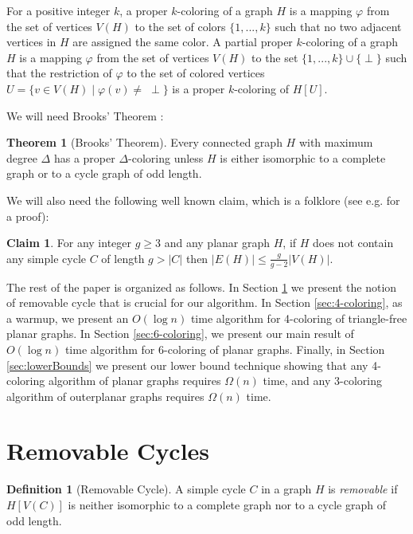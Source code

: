 \documentclass{article}
\theoremstyle{definition}
\newtheorem{theorem}{Theorem}[section]
\newtheorem{definition}{Definition}[section]
\newtheorem{claim}{Claim}[section]
\begin{document}
For a positive integer $k$, a proper $k$-coloring of a graph $H$ is a mapping $\varphi$ from the set of vertices $V(H)$ to the set of colors $\{1, ..., k\}$ such that no two adjacent vertices in $H$ are assigned the same color. A partial proper $k$-coloring of a graph $H$ is a mapping $\varphi$ from the set of vertices $V(H)$ to the set $\{1, ..., k\} \cup \{\perp\}$ such that the restriction of $\varphi$ to the set of colored vertices $U = \{v \in V(H) \mid \varphi(v) \ne \; \perp\}$ is a proper $k$-coloring of $H[U]$.

\medskip

We will need Brooks' Theorem \cite{Brooks41}:

\begin{theorem}[Brooks' Theorem] Every connected graph $H$ with maximum degree $\Delta$ has a proper $\Delta$-coloring unless $H$ is either isomorphic to a complete graph or to a cycle graph of odd length.\end{theorem}

We will also need the following well known claim, which is a folklore (see e.g. \cite{BarenboimElkinBook13} for a proof):
\begin{claim} For any integer $g \ge 3$ and any planar graph $H$, if $H$ does not contain any simple cycle $C$ of length $g > |C|$ then $|E(H)| \le \frac{g}{g-2}|V(H)|$.\label{claim:numberOfEdges}
\end{claim}

The rest of the paper is organized as follows.
In Section \ref{sec:removable} we present the notion of removable cycle that is crucial for our algorithm.
In Section \ref{sec:4-coloring}, as a warmup, we  present an $O(\log{n})$ time algorithm for 4-coloring  of triangle-free planar graphs.
In Section \ref{sec:6-coloring}, we present our main result of $O(\log{n})$ time algorithm for 6-coloring  of planar graphs.
Finally, in Section \ref{sec:lowerBounds} we present our lower bound technique showing that any 4-coloring algorithm of planar graphs requires $\Omega(n)$ time, and any 3-coloring algorithm of outerplanar graphs requires $\Omega(n)$ time.

\section{Removable Cycles}
\label{sec:removable}
\begin{definition}[Removable Cycle] A simple cycle $C$ in a graph $H$ is {\em removable} if $H[V(C)]$ is neither isomorphic to a complete graph nor to a cycle graph of odd length.\end{definition}
\end{document}
